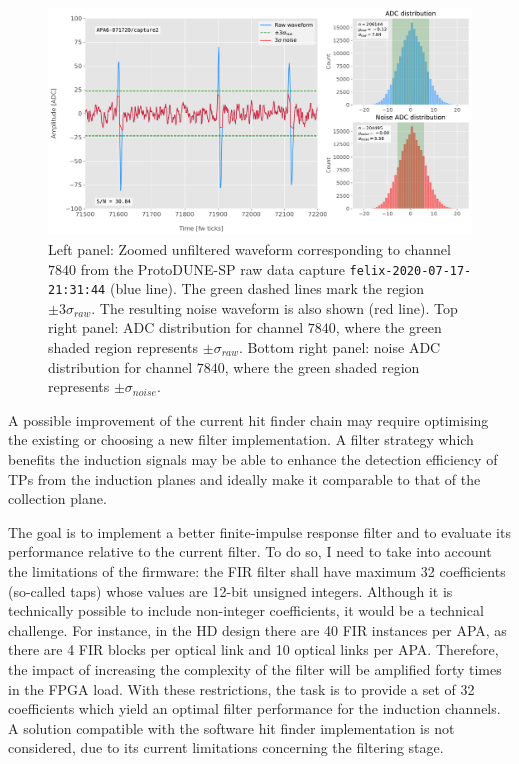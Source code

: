 \begin{figure}[t]
	\centering
	\includegraphics[width=1\linewidth]{Images/Matched_Filter/waveform_example_raw}
	\caption[Example unfiltered waveform from a ProtoDUNE-SP raw data capture.]{Left panel: Zoomed unfiltered waveform corresponding to channel $7840$ from the ProtoDUNE-SP raw data capture \texttt{felix-2020-07-17-21:31:44} (blue line). The green dashed lines mark the region $\pm3\sigma_{raw}$. The resulting noise waveform is also shown (red line). Top right panel: ADC distribution for channel $7840$, where the green shaded region represents $\pm \sigma_{raw}$. Bottom right panel: noise ADC distribution for channel $7840$, where the green shaded region represents $\pm \sigma_{noise}$.}
	\label{fig:adcs_nofir}
\end{figure}

A possible improvement of the current hit finder chain may require optimising the existing or choosing a new filter implementation. A filter strategy which benefits the induction signals may be able to enhance the detection efficiency of TPs from the induction planes and ideally make it comparable to that of the collection plane.  

The goal is to implement a better finite-impulse response filter and to evaluate its performance relative to the current filter. To do so, I need to take into account the limitations of the firmware: the FIR filter shall have maximum 32 coefficients (so-called taps) whose values are 12-bit unsigned integers. Although it is technically possible to include non-integer coefficients, it would be a technical challenge. For instance, in the HD design there are 40 FIR instances per APA, as there are 4 FIR blocks per optical link and 10 optical links per APA. Therefore, the impact of increasing the complexity of the filter will be amplified forty times in the FPGA load. With these restrictions, the task is to provide a set of 32 coefficients which yield an optimal filter performance for the induction channels. A solution compatible with the software hit finder implementation is not considered, due to its current limitations concerning the filtering stage.

